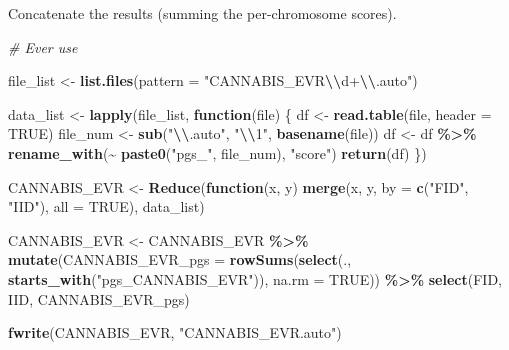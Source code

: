 \documentclass[
]{article}
\newenvironment{Shaded}{\begin{snugshade}}{\end{snugshade}}
\newcommand{\AttributeTok}[1]{\textcolor[rgb]{0.13,0.29,0.53}{#1}}
\newcommand{\CommentTok}[1]{\textcolor[rgb]{0.56,0.35,0.01}{\textit{#1}}}
\newcommand{\ConstantTok}[1]{\textcolor[rgb]{0.56,0.35,0.01}{#1}}
\newcommand{\ControlFlowTok}[1]{\textcolor[rgb]{0.13,0.29,0.53}{\textbf{#1}}}
\newcommand{\FunctionTok}[1]{\textcolor[rgb]{0.13,0.29,0.53}{\textbf{#1}}}
\newcommand{\NormalTok}[1]{#1}
\newcommand{\OtherTok}[1]{\textcolor[rgb]{0.56,0.35,0.01}{#1}}
\newcommand{\SpecialCharTok}[1]{\textcolor[rgb]{0.81,0.36,0.00}{\textbf{#1}}}
\newcommand{\StringTok}[1]{\textcolor[rgb]{0.31,0.60,0.02}{#1}}
\begin{document}
Concatenate the results (summing the per-chromosome scores).

\begin{Shaded}
\begin{Highlighting}[]
\CommentTok{\# Ever use}

\NormalTok{file\_list }\OtherTok{\textless{}{-}} \FunctionTok{list.files}\NormalTok{(}\AttributeTok{pattern =} \StringTok{"CANNABIS\_EVR}\SpecialCharTok{\textbackslash{}\textbackslash{}}\StringTok{d+}\SpecialCharTok{\textbackslash{}\textbackslash{}}\StringTok{.auto"}\NormalTok{)}

\NormalTok{data\_list }\OtherTok{\textless{}{-}} \FunctionTok{lapply}\NormalTok{(file\_list, }\ControlFlowTok{function}\NormalTok{(file) \{}
\NormalTok{  df }\OtherTok{\textless{}{-}} \FunctionTok{read.table}\NormalTok{(file, }\AttributeTok{header =} \ConstantTok{TRUE}\NormalTok{)}
\NormalTok{  file\_num }\OtherTok{\textless{}{-}} \FunctionTok{sub}\NormalTok{(}\StringTok{"}\SpecialCharTok{\textbackslash{}\textbackslash{}}\StringTok{.auto"}\NormalTok{, }\StringTok{"}\SpecialCharTok{\textbackslash{}\textbackslash{}}\StringTok{1"}\NormalTok{, }\FunctionTok{basename}\NormalTok{(file))}
\NormalTok{  df }\OtherTok{\textless{}{-}}\NormalTok{ df }\SpecialCharTok{\%\textgreater{}\%}
    \FunctionTok{rename\_with}\NormalTok{(}\SpecialCharTok{\textasciitilde{}} \FunctionTok{paste0}\NormalTok{(}\StringTok{"pgs\_"}\NormalTok{, file\_num), }\StringTok{"score"}\NormalTok{)}
  \FunctionTok{return}\NormalTok{(df)}
\NormalTok{\})}

\NormalTok{CANNABIS\_EVR }\OtherTok{\textless{}{-}} \FunctionTok{Reduce}\NormalTok{(}\ControlFlowTok{function}\NormalTok{(x, y) }\FunctionTok{merge}\NormalTok{(x, y, }\AttributeTok{by =} \FunctionTok{c}\NormalTok{(}\StringTok{"FID"}\NormalTok{, }\StringTok{"IID"}\NormalTok{), }\AttributeTok{all =} \ConstantTok{TRUE}\NormalTok{), data\_list)}

\NormalTok{CANNABIS\_EVR }\OtherTok{\textless{}{-}}\NormalTok{ CANNABIS\_EVR }\SpecialCharTok{\%\textgreater{}\%} 
  \FunctionTok{mutate}\NormalTok{(}\AttributeTok{CANNABIS\_EVR\_pgs =} \FunctionTok{rowSums}\NormalTok{(}\FunctionTok{select}\NormalTok{(., }\FunctionTok{starts\_with}\NormalTok{(}\StringTok{"pgs\_CANNABIS\_EVR"}\NormalTok{)), }\AttributeTok{na.rm =} \ConstantTok{TRUE}\NormalTok{)) }\SpecialCharTok{\%\textgreater{}\%} 
  \FunctionTok{select}\NormalTok{(FID, IID, CANNABIS\_EVR\_pgs)}

\FunctionTok{fwrite}\NormalTok{(CANNABIS\_EVR, }\StringTok{"CANNABIS\_EVR.auto"}\NormalTok{)}



\end{Highlighting}
\end{Shaded}
\end{document}
